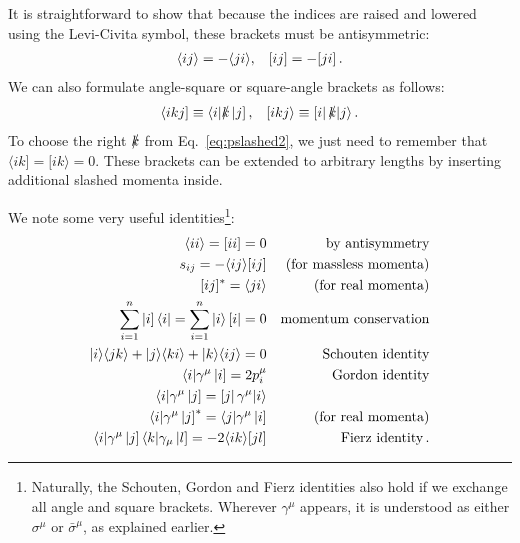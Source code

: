 \documentclass[main.tex]{subfiles}
\begin{document}
It is straightforward to show that because the indices are raised and lowered using the Levi-Civita symbol, these brackets must be antisymmetric:
\begin{align}
    \langle ij \rangle = -\langle ji \rangle, && [ ij ] = -[ ji ]\,.
\end{align}
We can also formulate angle-square or square-angle brackets as follows:
\begin{align}
    \langle ikj ] \equiv \langle i| \slashed{k} \left| j \right], && [ikj\rangle \equiv \left[ i \right| \slashed{k} |j \rangle\,.
\end{align}
To choose the right $\slashed{k}$ from Eq.~\ref{eq:pslashed2}, we just need to remember that $\langle ik] = [ik\rangle = 0$. These brackets can be extended to arbitrary lengths by inserting additional slashed momenta inside. 

We note some very useful identities\footnote{Naturally, the Schouten, Gordon and Fierz identities also hold if we exchange all angle and square brackets. Wherever $\gamma^\mu$ appears, it is understood as either $\sigma^\mu$ or $\bar{\sigma}^\mu$, as explained earlier.}:
\begin{subequations} \label{eq:spinorsids}
    \begin{align}
        \braket{ii} = \braketsq{ii} = 0 && \text{by antisymmetry} \label{eq:iieq0} \\
        s_{ij} = -\braket{ij}\braketsq{ij} && \text{(for massless momenta)} \\
        \braketsq{ij}^{\ast} = \braket{ji} && \text{(for real momenta)} \label{eq:complexconjbracket} \\
        \sum_{i=1}^n \ketsq{i}\bra{i} = \sum_{i=1}^n \ket{i}\brasq{i} = 0 && \text{momentum conservation} \label{eq:spinmomcons}\\
        \ket{i}\braket{jk} + \ket{j}\braket{ki} + \ket{k}\braket{ij} = 0 && \text{Schouten identity} \label{eq:schouten} \\
        \bra{i}\gamma^\mu \ketsq{i} = 2p_i^\mu && \text{Gordon identity} \label{eq:gordon} \\
        \bra{i} \gamma^\mu \ketsq{j} = \brasq{j}\gamma^\mu \ket{i} && \\
        \bra{i}\gamma^\mu \ketsq{j}^{\ast} = \bra{j}\gamma^\mu \ketsq{i} && \text{(for real momenta)} \\
        \bra{i}\gamma^\mu \ketsq{j} \bra{k}\gamma_\mu \ketsq{l} = -2\braket{ik}\braketsq{jl} && \text{Fierz identity} \label{eq:fierz} \,.
    \end{align}

\end{subequations}
\end{document}
